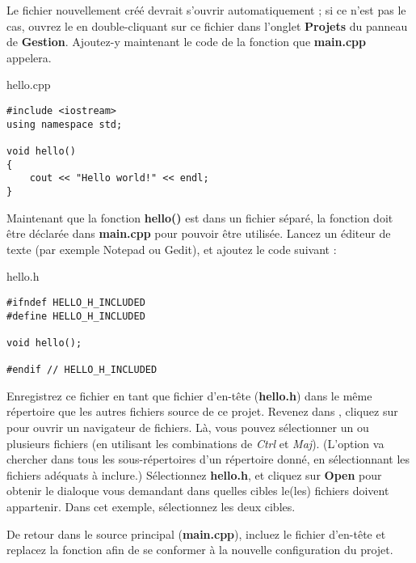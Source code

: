 Le fichier nouvellement créé devrait s'ouvrir automatiquement ; si ce n'est pas le cas, ouvrez le en double-cliquant sur ce fichier dans l'onglet \textbf{Projets} du panneau de \textbf{Gestion}. Ajoutez-y maintenant le code de la fonction que \textbf{main.cpp} appelera.

hello.cpp
\begin{lstlisting}
#include <iostream>
using namespace std;
  
void hello()
{
    cout << "Hello world!" << endl;
} 
\end{lstlisting}


Maintenant que la fonction \textbf{hello()} est dans un fichier séparé, la fonction doit être déclarée dans \textbf{main.cpp} pour pouvoir être utilisée. Lancez un éditeur de texte (par exemple Notepad ou Gedit), et ajoutez le code suivant :

hello.h 
\begin{lstlisting}
#ifndef HELLO_H_INCLUDED
#define HELLO_H_INCLUDED
     
void hello();
     
#endif // HELLO_H_INCLUDED
\end{lstlisting}

Enregistrez ce fichier en tant que fichier d'en-tête (\textbf{hello.h}) dans le même répertoire que les autres fichiers source de ce projet. Revenez dans \codeblocks, cliquez sur  pour ouvrir un navigateur de fichiers. Là, vous pouvez sélectionner un ou plusieurs fichiers (en utilisant les combinations de \textit{Ctrl} et \textit{Maj}). (L'option  va chercher dans tous les sous-répertoires d'un répertoire donné, en sélectionnant les fichiers adéquats à inclure.) Sélectionnez \textbf{hello.h}, et cliquez sur \textbf{Open} pour obtenir le dialoque vous demandant dans quelles cibles le(les) fichiers doivent appartenir. Dans cet exemple, sélectionnez les deux cibles. 



De retour dans le source principal (\textbf{main.cpp}), incluez le fichier d'en-tête et replacez la fonction  afin de se conformer à la nouvelle configuration du projet.


